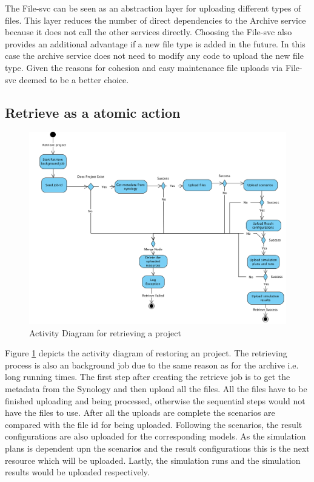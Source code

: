 The File-svc can be seen as an abstraction layer for uploading different types of files. This layer reduces the number of direct dependencies to the Archive
service because it does not call the other services directly. Choosing the File-svc also provides an additional advantage if a new file type is added in the future.
In this case the archive service does not need to modify any code to upload the new file type. Given the reasons for cohesion and easy maintenance file uploads
via File-svc deemed to be a better choice. 

\subsection{Retrieve as a atomic action}
\begin{figure}[H]
    \centering \includegraphics[scale=0.45]{grafiken/restoreActivity.png}
    \caption{Activity Diagram for retrieving a project}
    \label{fig:activityRestore}
\end{figure}

Figure \ref{fig:activityRestore} depicts the activity diagram of restoring an project. The retrieving process is also an background job due to the same reason
as for the archive i.e. long running times. The first step after creating the retrieve job is to get the metadata from the Synology and then upload all the files.
All the files have to be finished uploading and being processed, otherwise the sequential steps would not have the files to use. After all the uploads are complete
the scenarios are compared with the file id for being uploaded. Following the scenarios, the result configurations are also uploaded for the corresponding models.
As the simulation plans is dependent upn the scenarios and the result configurations this is the next resource which will be uploaded. Lastly, the simulation runs
and the simulation results would be uploaded respectively. 

